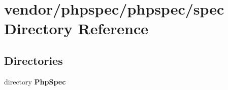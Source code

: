 \section{vendor/phpspec/phpspec/spec Directory Reference}
\label{dir_2a22f5f85652432727d530a85b2b7c3b}
\subsection*{Directories}
\begin{DoxyCompactItemize}
\item 
directory {\bf Php\+Spec}
\end{DoxyCompactItemize}
